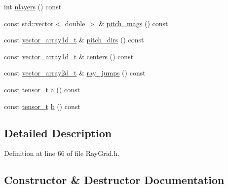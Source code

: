 \begin{DoxyCompactItemize}
\item 
int \hyperlink{class_wire_cell_1_1_ray_grid_1_1_coordinates_a7afeb960b9bd444468a4aea62ec4f5ec}{nlayers} () const
\item 
const std\+::vector$<$ double $>$ \& \hyperlink{class_wire_cell_1_1_ray_grid_1_1_coordinates_ae84a75729cdc5a180fe69d42809f72bc}{pitch\+\_\+mags} () const
\item 
const \hyperlink{namespace_wire_cell_1_1_ray_grid_a0406c6b8a3dc5f9127d665b6a2e6854a}{vector\+\_\+array1d\+\_\+t} \& \hyperlink{class_wire_cell_1_1_ray_grid_1_1_coordinates_a46010489c24f18c5946bc08f671ec1a9}{pitch\+\_\+dirs} () const
\item 
const \hyperlink{namespace_wire_cell_1_1_ray_grid_a0406c6b8a3dc5f9127d665b6a2e6854a}{vector\+\_\+array1d\+\_\+t} \& \hyperlink{class_wire_cell_1_1_ray_grid_1_1_coordinates_a71e1eb1063922a3e095f2e1635513110}{centers} () const
\item 
const \hyperlink{namespace_wire_cell_1_1_ray_grid_a5fe54fc4af050aa1782db6b9761df515}{vector\+\_\+array2d\+\_\+t} \& \hyperlink{class_wire_cell_1_1_ray_grid_1_1_coordinates_aba3b976c309d9e8010104d007674a0b7}{ray\+\_\+jumps} () const
\item 
const \hyperlink{namespace_wire_cell_1_1_ray_grid_adaca791d3ebd5f5c455aa89966289111}{tensor\+\_\+t} \hyperlink{class_wire_cell_1_1_ray_grid_1_1_coordinates_af5865a6804daf4b4a38c8d3a132a7e48}{a} () const
\item 
const \hyperlink{namespace_wire_cell_1_1_ray_grid_adaca791d3ebd5f5c455aa89966289111}{tensor\+\_\+t} \hyperlink{class_wire_cell_1_1_ray_grid_1_1_coordinates_a3fb41fbf5a6d27271b5f11576f502f29}{b} () const
\end{DoxyCompactItemize}


\subsection{Detailed Description}


Definition at line 66 of file Ray\+Grid.\+h.



\subsection{Constructor \& Destructor Documentation}
\mbox{\label{class_wire_cell_1_1_ray_grid_1_1_coordinates_a4b9a727396d48768585d9d13916b88c1}} 
